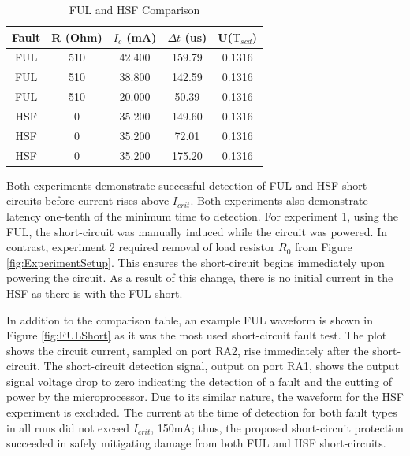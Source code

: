 \begin{table}
    \centering
    \bgroup
    \def\arraystretch{1.25}%
    \begin{tabular}{| c | c | c | c | c |}
            \hline			
            Fault & R (Ohm) & $I_{c}$ (mA) & $\Delta t$ (us) & U($\mathrm{T}_{scd}$)\\ \hline \hline \cline{1-5}
        FUL & 510 & 42.400 & 159.79 & 0.1316\\ \hline
        FUL & 510 & 38.800 & 142.59 & 0.1316\\	\hline
        FUL & 510 & 20.000 &  50.39 & 0.1316\\	\hline
        HSF &   0 & 35.200 & 149.60 & 0.1316\\	\hline
        HSF &   0 & 35.200 &  72.01 & 0.1316\\	\hline
        HSF &   0 & 35.200 & 175.20 & 0.1316\\	\hline
        \end{tabular}
    \egroup
    \caption{FUL and HSF Comparison}
    \label{tab:FULHSFComparison}
\end{table}

Both experiments demonstrate successful detection of FUL and HSF short-circuits before current rises above $I_{crit}$. Both experiments also demonstrate latency one-tenth of the minimum time to detection. For experiment 1, using the FUL, the short-circuit was manually induced while the circuit was powered. In contrast, experiment 2 required removal of load resistor $R_{0}$ from Figure \ref{fig:ExperimentSetup}. This ensures the short-circuit begins immediately upon powering the circuit. As a result of this change, there is no initial current in the HSF as there is with the FUL short.

In addition to the comparison table, an example FUL waveform is shown in Figure \ref{fig:FULShort} as it was the most used short-circuit fault test. The plot shows the circuit current, sampled on port RA2, rise immediately after the short-circuit. The short-circuit detection signal, output on port RA1, shows the output signal voltage drop to zero indicating the detection of a fault and the cutting of power by the microprocessor. Due to its similar nature, the waveform for the HSF experiment is excluded. The current at the time of detection for both fault types in all runs did not exceed $I_{crit}$, 150mA; thus, the proposed short-circuit protection succeeded in safely mitigating damage from both FUL and HSF short-circuits.

